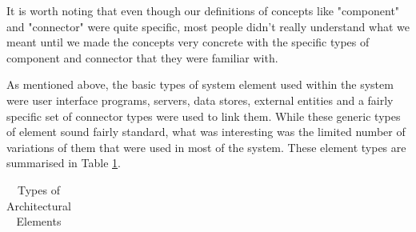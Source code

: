   It is worth noting that even though our definitions of concepts like "component" and "connector" were quite specific, most people didn't really understand what we meant until we made the concepts very concrete with the specific types of component and connector that they were familiar with.

  As mentioned above, the basic types of system element used within the system were user interface programs, servers, data stores, external entities and a fairly specific set of connector types were used to link them.  While these generic types of element sound fairly standard, what was interesting was the limited number of variations of them that were used in most of the system.  These element types are summarised in Table \ref{table:archelemtypes}.

  
\begin{table}
\caption{Types of Architectural Elements}
\label{table:archelemtypes}
\footnotesize

\begin{tabular}{l p{10cm}}


\end{tabular}
\end{table}

